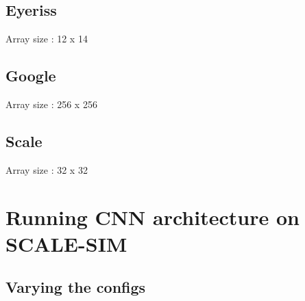 \documentclass[12pt]{article}
\begin{document}
\subsection{Eyeriss}
Array size : 12 x 14
\subsection{Google}
Array size : 256 x 256
\subsection{Scale}
Array size : 32 x 32






\section{Running CNN architecture on SCALE-SIM}

\subsection{Varying the configs}
\end{document}
